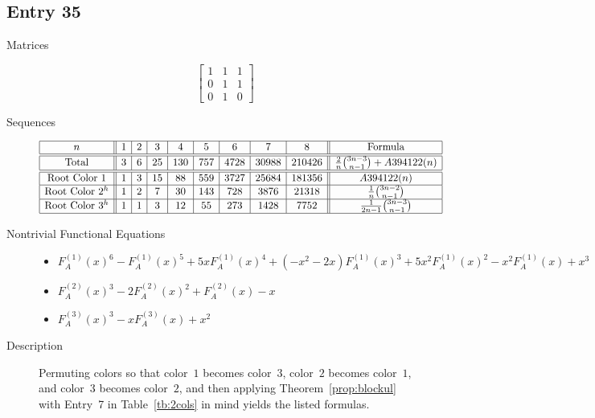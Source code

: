 \documentclass[12pt]{amsart}
\newcommand{\gff}[2]{F_{#2}^{(#1)}(x)}
\newcommand{\gfa}[1]{\gff{#1}{A}}
\begin{document}
\subsection*{Entry 35}
\begin{description}
    \item[Matrices]
    
    \[\begin{bmatrix}
1 & 1 & 1 \\
0 & 1 & 1 \\
0 & 1 & 0
\end{bmatrix}\]
    \item[Sequences]\hspace*{\fill}\vspace{-0.5cm}
    \begin{center}
        \[
        \begin{array}{|c||c|c|c|c|c|c|c|c||c|}\hline
           n  & 1 & 2 & 3 & 4 & 5 & 6 & 7 & 8  & \text{Formula}\\\hline\hline
           \text{Total}  & 3 & 6 & 25 & 130 & 757 & 4728 & 30988 & 210426 & \frac{2}{n}\binom{3n-3}{n-1}+A394122(n)\\\hline\hline
           \text{Root Color }1 & 1 & 3 & 15 & 88 & 559 & 3727 & 25684 & 181356 & A394122(n) \\\hline
           \text{Root Color }2^{h} & 1 & 2 & 7 & 30 & 143 & 728 & 3876 & 21318 & \frac{1}{n}\binom{3n-2}{n-1}\\\hline
           \text{Root Color }3^{h} & 1 & 1 & 3 & 12 & 55 & 273 & 1428 & 7752 & \frac{1}{2n-1}\binom{3n-3}{n-1}\\\hline
        \end{array}
        \]
    \end{center}
    
    \item[Nontrivial Functional Equations]\hspace*{\fill}

    \begin{itemize}
\item $\gfa{1}^6-\gfa{1}^5+5x\gfa{1}^4+(-x^2 - 2x)\gfa{1}^3+5x^2\gfa{1}^2-x^2\gfa{1}+x^3$


\item $\gfa{2}^3-2\gfa{2}^2+\gfa{2}-x$


\item $\gfa{3}^3-x\gfa{3}+x^2$


\end{itemize}
    \item[Description] Permuting colors so that color~$1$ becomes color~$3$, color~$2$ becomes color~$1$, and color~$3$ becomes color~$2$, and then applying Theorem~\ref{prop:blockul} with Entry~7 in Table~\ref{tb:2cols} 
    in mind yields the listed formulas.
    
\end{description}
\end{document}
